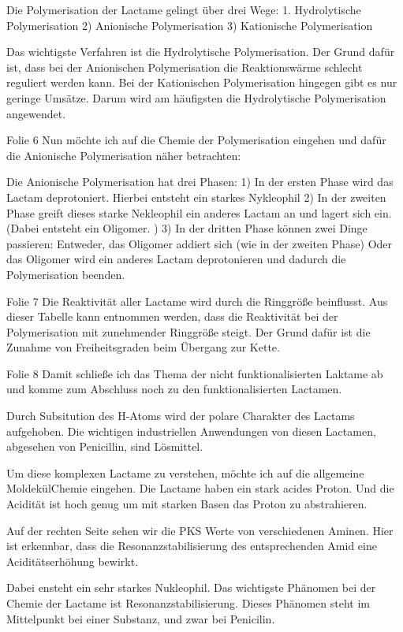 \documentclass{article}
\begin{document}
Die Polymerisation der Lactame gelingt über drei Wege:
1. Hydrolytische Polymerisation
2) Anionische Polymerisation
3) Kationische Polymerisation

Das wichtigste Verfahren ist die Hydrolytische Polymerisation. Der Grund dafür ist, dass bei der  Anionischen Polymerisation die Reaktionswärme schlecht reguliert werden kann. Bei der Kationischen Polymerisation hingegen gibt es nur geringe Umsätze. Darum wird am häufigsten die Hydrolytische Polymerisation angewendet. 




Folie 6
Nun möchte ich auf die Chemie der Polymerisation eingehen und dafür die Anionische Polymerisation näher betrachten: 

Die Anionische Polymerisation hat drei Phasen: 
1) In der ersten Phase wird das Lactam deprotoniert. Hierbei entsteht ein starkes Nykleophil
2) In der zweiten Phase greift dieses starke Nekleophil ein anderes Lactam an und lagert sich ein. (Dabei entsteht ein Oligomer. )
3) In der dritten Phase können zwei Dinge passieren: 
	Entweder, das Oligomer addiert sich (wie in der zweiten Phase)
	Oder das Oligomer wird ein anderes Lactam deprotonieren und dadurch die Polymerisation beenden. 




Folie 7
Die Reaktivität aller Lactame wird durch die Ringgröße beinflusst. 
Aus dieser Tabelle kann entnommen werden, dass die Reaktivität bei der Polymerisation mit zunehmender Ringgröße steigt. Der Grund dafür ist die Zunahme von Freiheitsgraden beim Übergang zur Kette. 



Folie 8
Damit schließe ich das Thema der nicht funktionalisierten Laktame ab und komme zum Abschluss noch zu  den funktionalisierten Lactamen.

Durch Subsitution des H-Atoms wird der polare Charakter des Lactams aufgehoben. 
Die wichtigen industriellen Anwendungen von diesen Lactamen, abgesehen von Penicillin, sind Lösmittel. 

Um diese komplexen Lactame zu verstehen, möchte ich auf die allgemeine MoldekülChemie eingehen. 
Die Lactame haben ein stark acides Proton.  Und die Acidität ist hoch genug um mit starken Basen das Proton zu abstrahieren. 

Auf der rechten Seite sehen wir die PKS Werte von verschiedenen Aminen. Hier ist erkennbar, dass die Resonanzstabilisierung des entsprechenden Amid eine Aciditätserhöhung bewirkt.

Dabei ensteht ein sehr starkes Nukleophil. Das wichtigste Phänomen bei der Chemie der Lactame ist Resonanzstabilisierung. 
Dieses Phänomen steht im Mittelpunkt bei einer Substanz, und zwar bei Penicilin.
\end{document}
